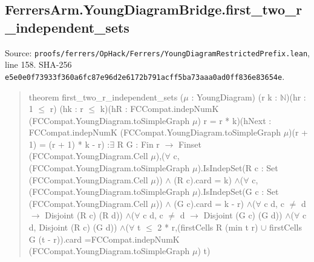 \documentclass[11pt,a4paper]{article}
\begin{document}
\subsection{FerrersArm.YoungDiagramBridge.first\_two\_r\_independent\_sets}
Source: \texttt{proofs/ferrers/OpHack/Ferrers/YoungDiagramRestrictedPrefix.lean}, line 158. SHA-256 \texttt{e5e0e0f73933f360a6fc87e96d2e6172b791acff5ba73aaa0ad0ff836e83654e}.

\begin{quote}\small\ttfamily theorem first\_two\_r\_independent\_sets (\ensuremath{\mu} : YoungDiagram) (r k : \ensuremath{\mathbb{N}})\newline (hr : 1 \ensuremath{\leq} r) (hk : r \ensuremath{\leq} k)\newline (hR : FCCompat.indepNumK (FCCompat.YoungDiagram.toSimpleGraph \ensuremath{\mu}) r = r * k)\newline (hNext : FCCompat.indepNumK (FCCompat.YoungDiagram.toSimpleGraph \ensuremath{\mu})\newline (r + 1) = (r + 1) * k - r) :\newline \ensuremath{\exists} R G : Fin r \ensuremath{\to} Finset (FCCompat.YoungDiagram.Cell \ensuremath{\mu}),\newline (\ensuremath{\forall} c, (FCCompat.YoungDiagram.toSimpleGraph \ensuremath{\mu}).IsIndepSet\newline (R c : Set (FCCompat.YoungDiagram.Cell \ensuremath{\mu})) \ensuremath{\wedge} (R c).card = k) \ensuremath{\wedge}\newline (\ensuremath{\forall} c, (FCCompat.YoungDiagram.toSimpleGraph \ensuremath{\mu}).IsIndepSet\newline (G c : Set (FCCompat.YoungDiagram.Cell \ensuremath{\mu})) \ensuremath{\wedge} (G c).card = k - r) \ensuremath{\wedge}\newline (\ensuremath{\forall} c d, c \ensuremath{\neq} d \ensuremath{\to} Disjoint (R c) (R d)) \ensuremath{\wedge}\newline (\ensuremath{\forall} c d, c \ensuremath{\neq} d \ensuremath{\to} Disjoint (G c) (G d)) \ensuremath{\wedge}\newline (\ensuremath{\forall} c d, Disjoint (R c) (G d)) \ensuremath{\wedge}\newline (\ensuremath{\forall} t \ensuremath{\leq} 2 * r,\newline (firstCells R (min t r) \ensuremath{\cup} firstCells G (t - r)).card =\newline FCCompat.indepNumK (FCCompat.YoungDiagram.toSimpleGraph \ensuremath{\mu}) t)\end{quote}
\end{document}
